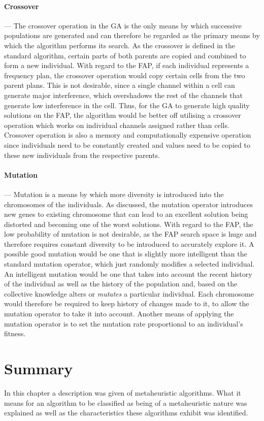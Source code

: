 \paragraph{Crossover}
--- The crossover operation in the \gls{GA} is the only means by which successive populations are generated and can therefore be regarded as the primary means by which the algorithm performs its search. As the crossover is defined in the standard algorithm, certain parts of both parents are copied and combined to form a new individual. With regard to the \gls{FAP}, if each individual represents a frequency plan, the crossover operation would copy certain cells from the two parent plans. This is not desirable, since a single channel within a cell can generate major interference, which overshadows the rest of the channels that generate low interference in the cell. Thus, for the \gls{GA} to generate high quality solutions on the \gls{FAP}, the algorithm would be better off utilising a crossover operation which works on individual channels assigned rather than cells. Crossover operation is also a memory and computationally expensive operation since individuals need to be constantly created and values need to be copied to these new individuals from the respective parents.
\paragraph{Mutation}
--- Mutation is a means by which more diversity is introduced into the chromosomes of the individuals.  As discussed, the mutation operator introduces new genes to existing chromosome that can lead to an excellent solution being distorted and becoming one of the worst solutions. With regard to the \gls{FAP}, the low probability of mutation is not desirable, as the \gls{FAP} search space is huge and therefore requires constant diversity to be introduced to accurately explore it. A possible good mutation would be one that is slightly more intelligent than the standard mutation operator, which just randomly modifies a selected individual. An intelligent mutation would be one that takes into account the recent history of the individual as well as the history of the population and, based on the collective knowledge alters or \emph{mutates} a particular individual. Each chromosome would therefore be required to keep history of changes made to it, to allow the mutation operator to take it into account. Another means of applying the mutation operator is to set the mutation rate proportional to an individual's fitness.
\section {Summary}
In this chapter a description was given of metaheuristic algorithms. What it means for an algorithm to be classified as being of a metaheuristic nature was explained as well as the characteristics these algorithms exhibit was identified.

